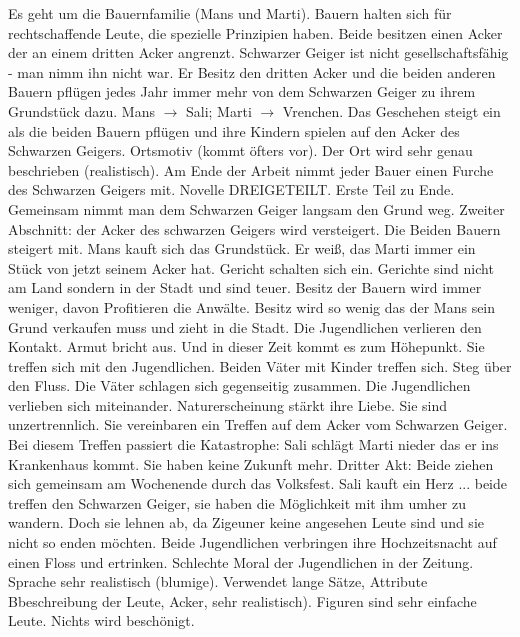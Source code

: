 \documentclass[12pt,a4paper]{article}
\begin{document}
Es geht um die Bauernfamilie (Mans und Marti). Bauern halten sich für rechtschaffende Leute, die spezielle Prinzipien haben. Beide besitzen einen Acker der an einem dritten Acker angrenzt. Schwarzer Geiger ist nicht gesellschaftsfähig - man nimm ihn nicht war. Er Besitz den dritten Acker und die beiden anderen Bauern pflügen jedes Jahr immer mehr von dem Schwarzen Geiger zu ihrem Grundstück dazu. Mans $\rightarrow$ Sali; Marti $\rightarrow$ Vrenchen.
\newline
\newline
Das Geschehen steigt ein als die beiden Bauern pflügen und ihre Kindern spielen auf den Acker des Schwarzen Geigers. Ortsmotiv (kommt öfters vor). Der Ort wird sehr genau beschrieben (realistisch). Am Ende der Arbeit nimmt jeder Bauer einen Furche des Schwarzen Geigers mit. Novelle DREIGETEILT. Erste Teil zu Ende. Gemeinsam nimmt man dem Schwarzen Geiger langsam den Grund weg.
\newline
\newline
Zweiter Abschnitt: der Acker des schwarzen Geigers wird versteigert. Die Beiden Bauern steigert mit. Mans kauft sich das Grundstück. Er weiß, das Marti immer ein Stück von jetzt seinem Acker hat. Gericht schalten sich ein. Gerichte sind nicht am Land sondern in der Stadt und sind teuer. Besitz der Bauern wird immer weniger, davon Profitieren die Anwälte. Besitz wird so wenig das der Mans sein Grund verkaufen muss und zieht in die Stadt. Die Jugendlichen verlieren den Kontakt. Armut bricht aus. Und in dieser Zeit kommt es zum Höhepunkt. Sie treffen sich mit den Jugendlichen. Beiden Väter mit Kinder treffen sich. Steg über den Fluss. Die Väter schlagen sich gegenseitig zusammen. Die Jugendlichen verlieben sich miteinander. Naturerscheinung stärkt ihre Liebe. Sie sind unzertrennlich. Sie vereinbaren ein Treffen auf dem Acker vom Schwarzen Geiger.  Bei diesem Treffen passiert die Katastrophe: Sali schlägt Marti nieder das er ins Krankenhaus kommt. Sie haben keine Zukunft mehr. Dritter Akt: Beide ziehen sich gemeinsam am Wochenende durch das Volksfest. Sali kauft ein Herz ... beide treffen den Schwarzen Geiger, sie haben die Möglichkeit mit ihm umher zu wandern. Doch sie lehnen ab, da Zigeuner keine angesehen Leute sind und sie nicht so enden möchten. Beide Jugendlichen verbringen ihre Hochzeitsnacht auf einen Floss und ertrinken. Schlechte Moral der Jugendlichen in der Zeitung. Sprache sehr realistisch (blumige). Verwendet lange Sätze, Attribute Bbeschreibung der Leute, Acker, sehr realistisch). Figuren sind sehr einfache Leute. Nichts wird beschönigt.
\end{document}
